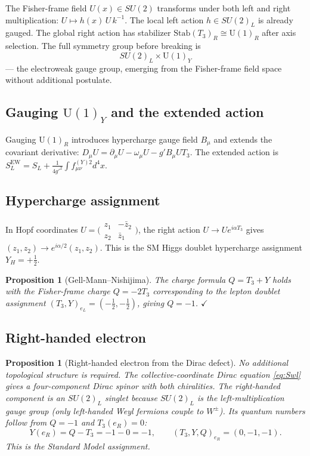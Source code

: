 \documentclass[12pt]{article}
\newtheorem{proposition}[theorem]{Proposition}
\theoremstyle{definition}
\theoremstyle{remark}
\begin{document}
The Fisher-frame field $U(x)\in SU(2)$ transforms under both left and right
multiplication: $U\mapsto h(x)\,U\,k^{-1}$.  The local left action
$h\in SU(2)_L$ is already gauged.  The global right action has stabilizer
$\mathrm{Stab}(T_3)_R\cong\mathrm{U}(1)_R$ after axis selection.  The full
symmetry group before breaking is
\begin{equation}
SU(2)_L\times\mathrm{U}(1)_Y
\end{equation}
--- the electroweak gauge group, emerging from the Fisher-frame field space
without additional postulate.

\subsection{Gauging $\mathrm{U}(1)_Y$ and the extended action}

Gauging $\mathrm{U}(1)_R$ introduces hypercharge gauge field $B_\mu$ and
extends the covariant derivative:
$D_\mu U=\partial_\mu U-\omega_\mu U - g'B_\mu U T_3$.
The extended action is $S_L^{\mathrm{EW}}=S_L+\frac{1}{4g'^2}\int f_{\mu\nu}^{(Y)2}d^4x$.

\subsection{Hypercharge assignment}

In Hopf coordinates $U=\bigl(\begin{smallmatrix}z_1&-\bar z_2\\z_2&\bar z_1\end{smallmatrix}\bigr)$,
the right action $U\to Ue^{i\alpha T_3}$ gives $(z_1,z_2)\to e^{i\alpha/2}(z_1,z_2)$.
This is the SM Higgs doublet hypercharge assignment $Y_H=+\tfrac{1}{2}$.

\begin{proposition}[Gell-Mann--Nishijima]
The charge formula $Q=T_3+Y$ holds with the Fisher-frame charge $Q=-2T_3$
corresponding to the lepton doublet assignment $(T_3,Y)_{e_L}=(-\tfrac{1}{2},-\tfrac{1}{2})$,
giving $Q=-1$. $\checkmark$
\end{proposition}

\subsection{Right-handed electron}

\begin{proposition}[Right-handed electron from the Dirac defect]
No additional topological structure is required.  The collective-coordinate
Dirac equation \eqref{eq:Swl} gives a four-component Dirac spinor with both
chiralities.  The right-handed component is an $SU(2)_L$ singlet because
$SU(2)_L$ is the left-multiplication gauge group (only left-handed Weyl
fermions couple to $W^\pm$).  Its quantum numbers follow from
$Q=-1$ and $T_3(e_R)=0$:
\begin{equation}
Y(e_R)=Q-T_3=-1-0=-1,\qquad
(T_3,Y,Q)_{e_R}=(0,-1,-1).
\end{equation}
This is the Standard Model assignment.
\end{proposition}
\end{document}
